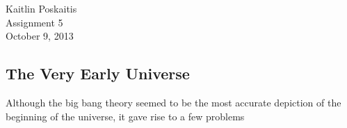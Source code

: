 \documentclass[12pt]{article}
\begin{document}
\noindent Kaitlin Poskaitis\\
Assignment 5\\
October 9, 2013
\begin{center}
    \section*{\bf The Very Early Universe}
\end{center}


Although the big bang theory seemed to be the most accurate depiction of the
beginning of the universe, it gave rise to a few problems 
\end{document}
